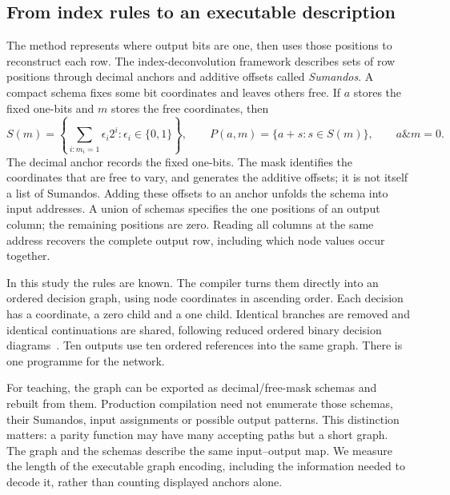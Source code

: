 \documentclass[11pt,a4paper]{article}
\newcommand{\bits}{\{0,1\}}
\begin{document}
\subsection{From index rules to an executable description}
The method represents where output bits are one, then uses those
positions to reconstruct each row. The index-deconvolution framework
describes sets of row positions through
decimal anchors and additive offsets called \emph{Sumandos}. A compact
schema fixes some bit coordinates and leaves others free. If $a$ stores
the fixed one-bits and $m$ stores the free coordinates, then
\begin{equation}\label{eq:schema}
 S(m)=\left\{\sum_{i:m_i=1}\epsilon_i2^i:\epsilon_i\in\bits\right\},
 \qquad P(a,m)=\{a+s:s\in S(m)\},\qquad a\mathbin{\&}m=0.
\end{equation}
The decimal anchor records the fixed one-bits. The mask identifies the
coordinates that are free to vary, and generates the additive offsets;
it is not itself a list of Sumandos. Adding these offsets to an anchor
unfolds the schema into input addresses. A union of schemas specifies
the one positions of an output column; the remaining positions are zero.
Reading all columns at the same address recovers the complete output
row, including which node values occur together.

In this study the rules are known. The compiler turns them directly into
an ordered decision graph, using node coordinates in
ascending order. Each decision has a coordinate, a zero child and a one
child. Identical branches are removed and identical continuations are
shared, following reduced ordered binary decision diagrams~\cite{bryant}.
Ten outputs use ten ordered references into the same graph. There is one
programme for the network.

For teaching, the graph can be exported as decimal/free-mask schemas and
rebuilt from them. Production compilation need not enumerate those schemas,
their Sumandos, input assignments or possible output patterns. This distinction
matters: a parity function may have many accepting paths but a short graph.
The graph and the schemas describe the same input--output map. We measure
the length of the executable graph encoding, including the information
needed to decode it, rather than counting displayed anchors alone.
\end{document}
